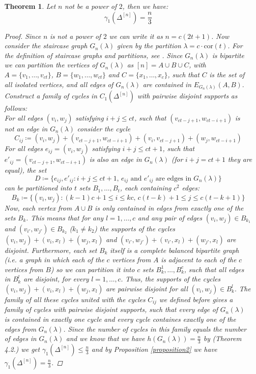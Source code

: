 \documentclass{article}
\newtheorem{thm}{Theorem}[section]
\begin{document}
\begin{thm}\label{theorem3}
Let $n$ not be a power of $2$, then we have:
\[
\gamma_1(\Delta^{[n]})=\frac{n}{3}
\] 
\begin{proof}
Since $n$ is not a power of $2$ we can write it as $n=c(2t+1)$. Now consider the staircase graph $G_n(\lambda)$ given by the partition $\lambda=c\cdot\text{cor}(t)$. For the definition of staircase graphs and partitions, see \cite{2}. Since $G_n(\lambda)$ is bipartite we can partition the vertices of $G_n(\lambda)$ as $[n]=A\cup B\cup C$, with $A=\{v_1,\ldots,v_{ct}\}$, $B=\{w_1,\ldots,w_{ct}\}$ and $C=\{x_1,\ldots,x_c\}$, such that $C$ is the set of all isolated vertices, and all edges of $G_n(\lambda)$ are contained in $E_{G_n(\lambda)}(A,B)$. Construct a family of cycles in $C_1(\Delta^{[n]})$ with pairwise disjoint supports as follows:\\
For all edges $(v_i,w_j)$ satisfying $i+j\leq ct$, such that $(v_{ct-j+1},w_{ct-i+1})$ is not an edge in $G_n(\lambda)$ consider the cycle
\[
C_{ij}\coloneqq (v_i,w_j)+(v_{ct-j+1},w_{ct-i+1})+(v_i,v_{ct-j+1})+(w_j,w_{ct-i+1})
\]
For all edges $e_{ij}=(v_i,w_j)$ satisfying $i+j\leq ct+1$, such that $e'_{ij}=(v_{ct-j+1},w_{ct-i+1})$ is also an edge in $G_n(\lambda)$ (for $i+j=ct+1$ they are equal), the set
\[
D\coloneqq\{e_{ij}, e'_{ij}:i+j\leq ct+1\text{, }e_{ij}\text{ and }e'_{ij}\text{ are edges in }G_n(\lambda)\}
\] can be partitioned into $t$ sets $B_1,\ldots,B_t$, each containing $c^2$ edges:
\[
B_k\coloneqq\{(v_i,w_j):(k-1)c+1\leq i\leq kc\text{, }c(t-k)+1\leq j\leq c(t-k+1)\}
\]
Now, each vertex from $A\cup B$ is only contained in edges from exactly one of the sets $B_k$. This means that for any $l=1,\ldots,c$ and any pair of edges $(v_i,w_j)\in B_{k_1}$ and $(v_{i'},w_{j'})\in B_{k_2}$ ($k_1\neq k_2$) the supports of the cycles $(v_i,w_j)+(v_i,x_l)+(w_j,x_l)$ and $(v_{i'},w_{j'})+(v_{i'},x_l)+(w_{j'},x_l)$ are disjoint. Furthermore, each set $B_k$ itself is a complete balanced bipartite graph (i.e. a graph in which each of the $c$ vertices from $A$ is adjacent to each of the $c$ vertices from $B$) so we can partition it into $c$ sets $B_k^1,\ldots,B_k^c$, such that all edges in $B_k^l$ are disjoint, for every $l=1,\ldots,c$. Thus, the supports of the cycles $(v_i,w_j)+(v_i,x_l)+(w_j,x_l)$ are pairwise disjoint for all $(v_i,w_j)\in B_k^l$. The family of all these cycles united with the cycles $C_{ij}$ we defined before gives a family of cycles with pairwise disjoint supports, such that every edge of $G_n(\lambda)$ is contained in exactly one cycle and every cycle containes exactly one of the edges from $G_n(\lambda)$. Since the number of cycles in this family equals the number of edges in $G_n(\lambda)$ and we know that we have $h(G_n(\lambda))=\frac{n}{3}$ by \cite{2} (Theorem 4.2.) we get $\gamma_1(\Delta^{[n]})\leq\frac{n}{3}$ and by Proposition \ref{proposition2} we have $\gamma_1(\Delta^{[n]})=\frac{n}{3}$.
\end{proof}
\end{thm}
\end{document}
